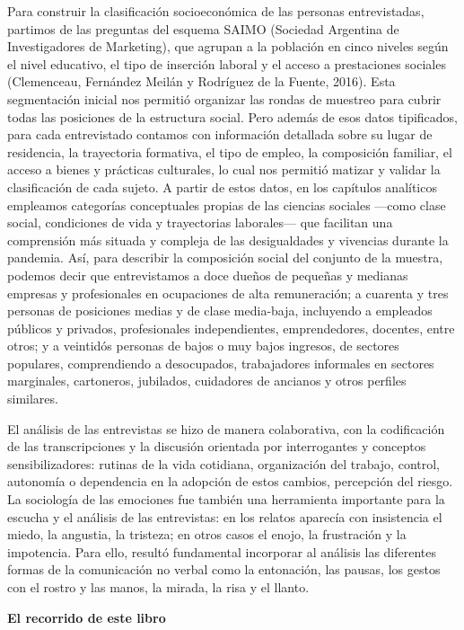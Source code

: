Para construir la clasificación socioeconómica de las personas entrevistadas, partimos de las preguntas del esquema SAIMO (Sociedad Argentina de Investigadores de Marketing), que agrupan a la población en cinco niveles según el nivel educativo, el tipo de inserción laboral y el acceso a prestaciones sociales (Clemenceau, Fernández Meilán y Rodríguez de la Fuente, 2016). Esta segmentación inicial nos permitió organizar las rondas de muestreo para cubrir todas las posiciones de la estructura social. Pero además de esos datos tipificados, para cada entrevistado contamos con información detallada sobre su lugar de residencia, la trayectoria formativa, el tipo de empleo, la composición familiar, el acceso a bienes y prácticas culturales, lo cual nos permitió matizar y validar la clasificación de cada sujeto. A partir de estos datos, en los capítulos analíticos empleamos categorías conceptuales propias de las ciencias sociales ---como clase social, condiciones de vida y trayectorias laborales--- que facilitan una comprensión más situada y compleja de las desigualdades y vivencias durante la pandemia. Así, para describir la composición social del conjunto de la muestra, podemos decir que entrevistamos a doce dueños de pequeñas y medianas empresas y profesionales en ocupaciones de alta remuneración; a cuarenta y tres personas de posiciones medias y de clase media-baja, incluyendo a empleados públicos y privados, profesionales independientes, emprendedores, docentes, entre otros; y a veintidós personas de bajos o muy bajos ingresos, de sectores populares, comprendiendo a desocupados, trabajadores informales en sectores marginales, cartoneros, jubilados, cuidadores de ancianos y otros perfiles similares.

El análisis de las entrevistas se hizo de manera colaborativa, con la codificación de las transcripciones y la discusión orientada por interrogantes y conceptos sensibilizadores: rutinas de la vida cotidiana, organización del trabajo, control, autonomía o dependencia en la adopción de estos cambios, percepción del riesgo. La sociología de las emociones fue también una herramienta importante para la escucha y el análisis de las entrevistas: en los relatos aparecía con insistencia el miedo, la angustia, la tristeza; en otros casos el enojo, la frustración y la impotencia. Para ello, resultó fundamental incorporar al análisis las diferentes formas de la comunicación no verbal como la entonación, las pausas, los gestos con el rostro y las manos, la mirada, la risa y el llanto.

\textbf{El recorrido de este libro}

